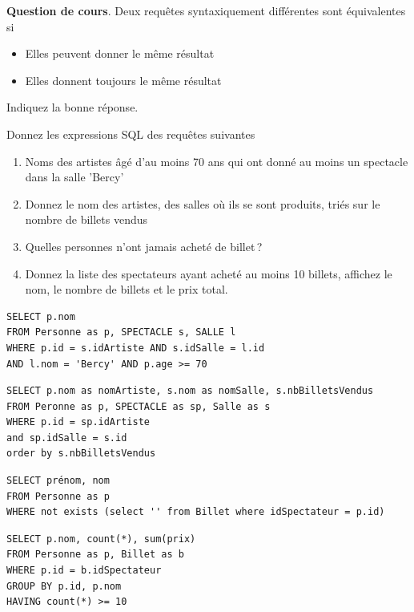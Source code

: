 \textbf{Question de cours}. Deux requêtes syntaxiquement différentes sont équivalentes si
\begin{itemize}
    \item Elles peuvent donner le même résultat
   \item  Elles donnent toujours le même résultat
\end{itemize}

   Indiquez la bonne réponse.
   

   Donnez les expressions SQL des requêtes suivantes
   
\begin{enumerate}
   
  \item Noms des artistes âgé d'au moins 70 ans qui ont donné au moins un spectacle dans la salle 'Bercy' 

   \item Donnez le nom des artistes, des salles où ils se sont produits, triés sur le nombre de billets vendus

  \item Quelles personnes n'ont jamais acheté de billet\,?
  
\item  Donnez la liste des spectateurs ayant acheté au moins 10 billets,
          affichez le nom, le nombre de billets et le prix total.
 
\end{enumerate}


\begin{solution}

\begin{verbatim}
SELECT p.nom
FROM Personne as p, SPECTACLE s, SALLE l
WHERE p.id = s.idArtiste AND s.idSalle = l.id 
AND l.nom = 'Bercy' AND p.age >= 70
\end{verbatim}

\begin{verbatim}
SELECT p.nom as nomArtiste, s.nom as nomSalle, s.nbBilletsVendus
FROM Peronne as p, SPECTACLE as sp, Salle as s
WHERE p.id = sp.idArtiste
and sp.idSalle = s.id
order by s.nbBilletsVendus
\end{verbatim}

\begin{verbatim}
SELECT prénom, nom
FROM Personne as p
WHERE not exists (select '' from Billet where idSpectateur = p.id)

\end{verbatim}

\begin{verbatim}
SELECT p.nom, count(*), sum(prix)
FROM Personne as p, Billet as b
WHERE p.id = b.idSpectateur
GROUP BY p.id, p.nom
HAVING count(*) >= 10
\end{verbatim}
\end{solution}

